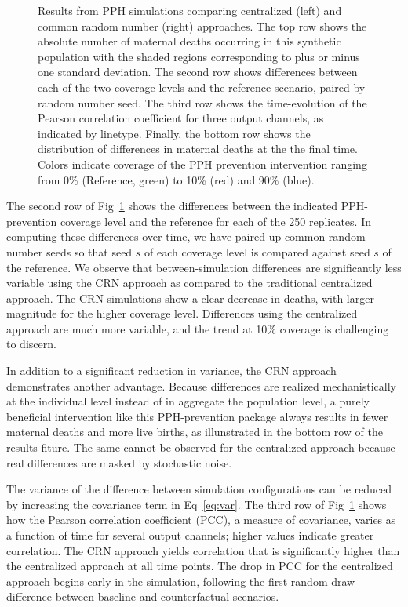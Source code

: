 \documentclass[10pt,letterpaper]{article}
\begin{document}
\begin{figure}[!ht]
\centering
\caption{Results from PPH simulations comparing centralized (left) and common random number (right) approaches. The top row shows the absolute number of maternal deaths occurring in this synthetic population with the shaded regions corresponding to plus or minus one standard deviation. The second row shows differences between each of the two coverage levels and the reference scenario, paired by random number seed. The third row shows the time-evolution of the Pearson correlation coefficient for three output channels, as indicated by linetype. Finally, the bottom row shows the distribution of differences in maternal deaths at the the final time. Colors indicate coverage of the PPH prevention intervention ranging from 0\% (Reference, green) to 10\% (red) and 90\% (blue).}
\label{f:pph_ts}
\end{figure}

The second row of Fig~\ref{f:pph_ts} shows the differences between the indicated PPH-prevention coverage level and the reference for each of the 250 replicates. In computing these differences over time, we have paired up common random number seeds so that seed $s$ of each coverage level is compared against seed $s$ of the reference. We observe that between-simulation differences are significantly less variable using the CRN approach as compared to the traditional centralized approach. The CRN simulations show a clear decrease in deaths, with larger magnitude for the higher coverage level. Differences using the centralized approach are much more variable, and the trend at 10\% coverage is challenging to discern.

In addition to a significant reduction in variance, the CRN approach demonstrates another advantage. Because differences are realized mechanistically at the individual level instead of in aggregate the population level, a purely beneficial intervention like this PPH-prevention package always results in fewer maternal deaths and more live births, as illunstrated in the bottom row of the results fiture. The same cannot be observed for the centralized approach because real differences are masked by stochastic noise.

The variance of the difference between simulation configurations can be reduced by increasing the covariance term in Eq~\ref{eq:var}. The third row of Fig~\ref{f:pph_ts} shows how the Pearson correlation coefficient (PCC), a measure of covariance, varies as a function of time for several output channels; higher values indicate greater correlation. The CRN approach yields correlation that is significantly higher than the centralized approach at all time points. The drop in PCC for the centralized approach begins early in the simulation, following the first random draw difference between baseline and counterfactual scenarios.
\end{document}
